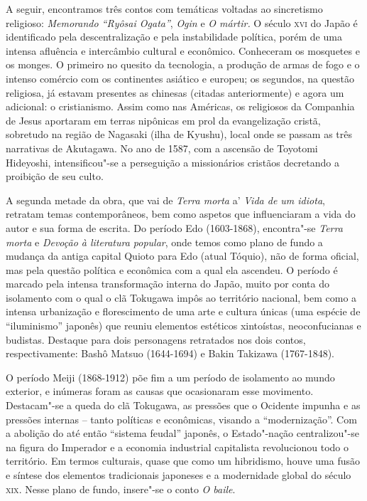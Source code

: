 \documentclass[12pt]{extarticle}
\begin{document}
A seguir, encontramos três contos com temáticas voltadas ao sincretismo
religioso: \emph{Memorando ``Ryôsai Ogata''}, \emph{Ogin} e \emph{O
mártir.} O século \textsc{xvi} do Japão é identificado pela descentralização e
pela instabilidade política, porém de uma intensa afluência e
intercâmbio cultural e econômico. Conheceram os mosquetes e os monges. O
primeiro no quesito da tecnologia, a produção de armas de fogo e o
intenso comércio com os continentes asiático e europeu; os segundos, na
questão religiosa, já estavam presentes as chinesas (citadas
anteriormente) e agora um adicional: o cristianismo. Assim como nas
Américas, os religiosos da Companhia de Jesus aportaram em terras
nipônicas em prol da evangelização cristã, sobretudo na região de
Nagasaki (ilha de Kyushu), local onde se passam as três narrativas de
Akutagawa. No ano de 1587, com a ascensão de Toyotomi Hideyoshi,
intensificou"-se a perseguição a missionários cristãos decretando a
proibição de seu culto.

A segunda metade da obra, que vai de \emph{Terra morta} a' \emph{Vida de
um idiota}, retratam temas contemporâneos, bem como aspetos que
influenciaram a vida do autor e sua forma de escrita. Do período Edo
(1603-1868), encontra"-se \emph{Terra morta} e \emph{Devoção à literatura
popular}, onde temos como plano de fundo a mudança da antiga capital
Quioto para Edo (atual Tóquio), não de forma oficial, mas pela questão
política e econômica com a qual ela ascendeu. O período é marcado pela
intensa transformação interna do Japão, muito por conta do isolamento
com o qual o clã Tokugawa impôs ao território nacional, bem como a
intensa urbanização e florescimento de uma arte e cultura únicas (uma
espécie de ``iluminismo'' japonês) que reuniu elementos estéticos
xintoístas, neoconfucianas e budistas. Destaque para dois personagens
retratados nos dois contos, respectivamente: Bashô Matsuo (1644-1694) e
Bakin Takizawa (1767-1848).

O período Meiji (1868-1912) põe fim a um período de isolamento ao mundo
exterior, e inúmeras foram as causas que ocasionaram esse movimento.
Destacam"-se a queda do clã Tokugawa, as pressões que o Ocidente impunha
e as pressões internas -- tanto políticas e econômicas, visando a
``modernização''. Com a abolição do até então ``sistema feudal''
japonês, o Estado"-nação centralizou"-se na figura do Imperador e a
economia industrial capitalista revolucionou todo o território. Em
termos culturais, quase que como um hibridismo, houve uma fusão e
síntese dos elementos tradicionais japoneses e a modernidade global do
século \textsc{xix}. Nesse plano de fundo, insere"-se o conto \emph{O baile}.
\end{document}
